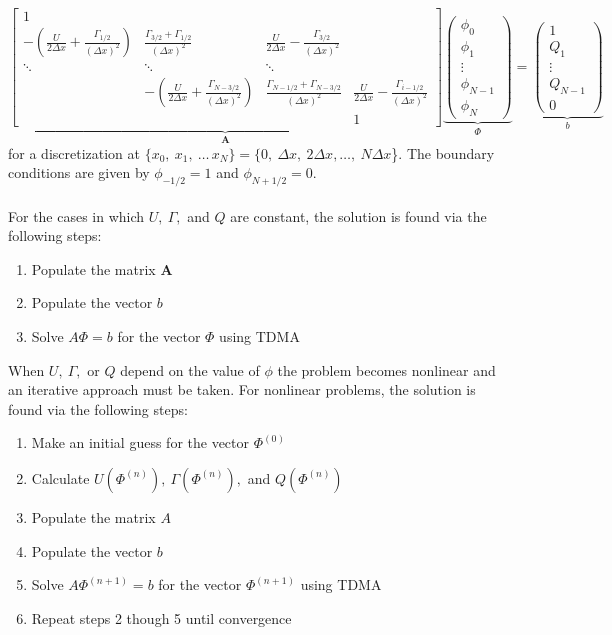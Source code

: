 \documentclass[reqno, 12pt]{article}
\begin{document}
    \begin{equation*}
        \underbrace{\begin{bmatrix}
        1 \\
        -\left(\frac{U}{2\Delta x} + \frac{\Gamma_{1/2}}{(\Delta x)^2}\right) & \frac{\Gamma_{3/2}+\Gamma_{1/2}}{(\Delta x)^2} & \frac{U}{2\Delta x} - \frac{\Gamma_{3/2}}{(\Delta x)^2} \\
        \ddots & \ddots & \ddots \\
        & -\left(\frac{U}{2\Delta x} + \frac{\Gamma_{N - 3/2}}{(\Delta x)^2}\right) & \frac{\Gamma_{N - 1/2}+\Gamma_{N - 3/2}}{(\Delta x)^2} & \frac{U}{2\Delta x} - \frac{\Gamma_{i -1/2}}{(\Delta x)^2} \\
        &&& 1
\end{bmatrix}}_{\mathrm{\bm{A}}}
\underbrace{\begin{pmatrix} \phi_{0} \\ \phi_{1} \\ \vdots \\ \phi_{N-1} \\ \phi_{N} \end{pmatrix}}_{\Phi}
        =
        \underbrace{\begin{pmatrix} 1 \\ Q_1 \\ \vdots \\ Q_{N-1} \\ 0 \end{pmatrix}}_{b}
    \end{equation*}
    for a discretization at $\{x_0,\ x_1,\ \dots \, x_N\} = \{0,\ \Delta x,\ 2\Delta x,\dots,\ N\Delta x$\}.
    The boundary conditions are given by $\phi_{-1/2} = 1$ and $\phi_{N + 1/2} = 0$. \\~\\
    For the cases in which $U,\ \Gamma,$ and $Q$ are constant, the solution is found via the following steps:
    \begin{enumerate}
        \item Populate the matrix $\mathrm{\bm{A}}$
        \item Populate the vector $b$
        \item Solve $A\Phi = b$ for the vector $\Phi$ using TDMA
    \end{enumerate}
    When $U,\ \Gamma,$ or $Q$ depend on the value of $\phi$ the problem becomes nonlinear and an iterative approach must be taken.
    For nonlinear problems, the solution is found via the following steps:
    \begin{enumerate}
        \item Make an initial guess for the vector $\Phi^{(0)}$
        \item Calculate $U(\Phi^{(n)}),\ \Gamma(\Phi^{(n)}),$ and $Q(\Phi^{(n)})$
        \item Populate the matrix $A$
        \item Populate the vector $b$
        \item Solve $A\Phi^{(n+1)} = b$ for the vector $\Phi^{(n+1)}$ using TDMA
        \item Repeat steps 2 though 5 until convergence
    \end{enumerate}
\end{document}
